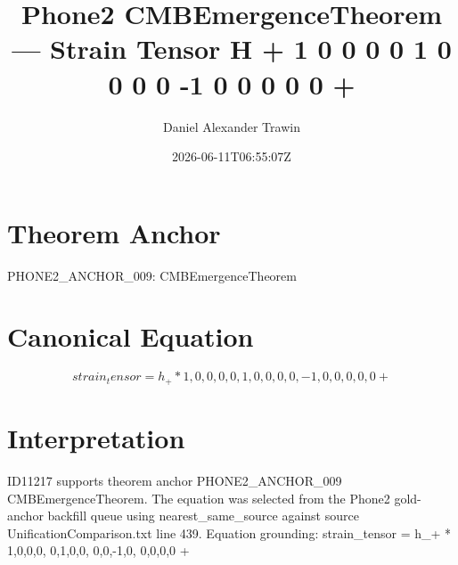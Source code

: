 \documentclass[11pt]{article}
\title{Phone2 CMBEmergenceTheorem — Strain Tensor H + 1 0 0 0 0 1 0 0 0 0 -1 0 0 0 0 0 +}
\author{Daniel Alexander Trawin}
\date{2026-06-11T06:55:07Z}
\begin{document}
\maketitle
\section*{Theorem Anchor}
PHONE2_ANCHOR_009: CMBEmergenceTheorem
\section*{Canonical Equation}
\[
strain_tensor = h_+ * {{1,0,0,0}, {0,1,0,0}, {0,0,-1,0}, {0,0,0,0}} +
\]
\section*{Interpretation}
ID11217 supports theorem anchor PHONE2_ANCHOR_009 CMBEmergenceTheorem. The equation was selected from the Phone2 gold-anchor backfill queue using nearest_same_source against source UnificationComparison.txt line 439. Equation grounding: strain_tensor = h_+ * {{1,0,0,0}, {0,1,0,0}, {0,0,-1,0}, {0,0,0,0}} +
\end{document}
